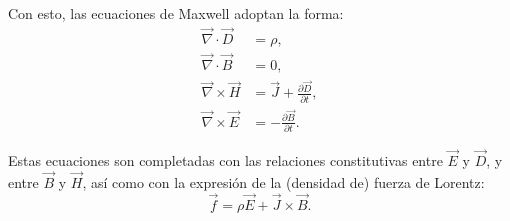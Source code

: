 Con esto, las ecuaciones de Maxwell adoptan la forma:
\begin{align}
\vec\nabla\cdot\vec{D} & =\rho ,\label{max1}\\
\vec\nabla\cdot\vec{B}  & =0 ,\label{max2}\\
\vec\nabla\times\vec{H}  & =\vec{J}+\frac{\partial\vec{D}}{\partial
t} ,\label{max3}\\
\vec\nabla\times\vec{E}  & =-\frac{\partial\vec{B}}{\partial t}.\label{max4}%
\end{align}

Estas ecuaciones son completadas con las relaciones constitutivas entre
$\vec{E}$ y $\vec{D}$, y entre $\vec{B}$ y $\vec{H}$, así como con la expresión de la (densidad de) fuerza de Lorentz:
\begin{equation}
\vec{f}=\rho\vec{E}+\vec{J}\times\vec{B}.
\end{equation}

